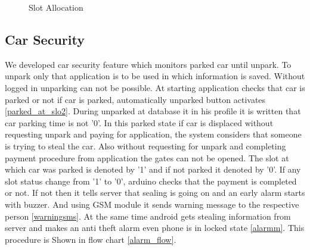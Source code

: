 \begin{figure}[H]
\hspace{1cm}
\caption{Slot Allocation}
\end{figure}

\subsection{Car Security}
We developed car security feature which monitors parked car until unpark. To unpark only that application is to be used in which information is saved. Without logged in unparking can not be possible. At starting application checks that car is parked or not if car is parked, automatically unparked button activates \ref{parked_at_slo2}. During unparked at database it in his profile it is written that car parking time is not '0'. In this parked state if car is displaced without requesting unpark and paying for application, the system considers that someone is trying to steal the car. Also without requesting for unpark and completing payment procedure from application the gates can not be opened. The slot at which car was  parked is denoted by '1' and if not parked it denoted by '0'. If any slot status change from '1' to '0', arduino checks that the payment is completed or not. If not then it tells server that sealing is going on and an early alarm starts with buzzer. And using GSM module it sends warning message to the respective person \ref{warningsms}. At the same time android gets stealing information from server and makes an anti theft alarm even phone is in locked state \ref{alarmm}. This procedure is Shown in flow chart \ref{alarm_flow}.


